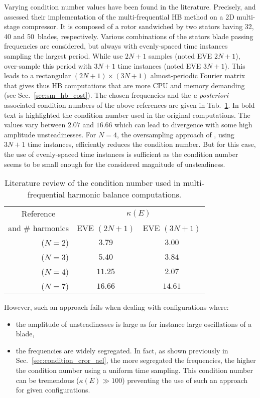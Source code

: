 Varying condition number values have been found in the literature.
Precisely, \citet{Gopinath2007} and
\citet{Ekici2007} assessed their implementation of the
multi-frequential HB method on a 2D multi-stage compressor. 
It is composed of a rotor sandwiched by two stators having
32, 40 and 50~blades, respectively. Various combinations of the stators
blade passing frequencies are considered, 
but always with evenly-spaced time instances sampling the
largest period.  While \citet{Gopinath2007} use $2N+1$ samples (noted EVE $2N+1$),
\citet{Ekici2007} over-sample this period with $3N+1$ time instances
(noted EVE $3N+1$). This
leads to a rectangular $(2N+1)\times(3N+1)$ almost-periodic Fourier
matrix that gives thus HB computations that are more CPU and memory demanding
(see Sec.~\ref{sec:sm_hb_cost}). 
The chosen frequencies and the \emph{a posteriori}
associated condition numbers of the above references are given in
Tab.~\ref{tab:literature_multistage}.  
In bold text is highlighted the condition number used in the
original computations. The values vary between $2.07$
and $16.66$ which can lead to divergence with some
high amplitude unsteadinesses.
For $N=4$, the
oversampling approach of \citet{Ekici2007}, using $3N+1$ 
time instances, efficiently reduces the
condition number. But for this case, the use of evenly-spaced time
instances is sufficient as the condition number seems to be small enough
for the considered magnitude of unsteadiness.
\begin{table}[htp]
   \centering
  \begin{tabular}{rcc}
    \toprule
    \multicolumn{1}{c}{Reference} & \multicolumn{2}{c}{$\kappa(E)$} \\
    \multicolumn{1}{c}{and \# harmonics} & EVE $(2N+1)$ & EVE $(3N+1)$ \\
    \midrule
    \citet{Gopinath2007} ($N=2$) & $\mathbf{3.79}$ & $3.00$ \\
    \citet{Ekici2007} ($N=3$) & $5.40$ & $\mathbf{3.84}$ \\
    \citet{Gopinath2007} ($N=4$) & $\mathbf{11.25}$ & $2.07$ \\
    \citet{Gopinath2007} ($N=7$) & $\mathbf{16.66}$ & $14.61$ \\
    \bottomrule
  \end{tabular}
  \caption{Literature review of the condition number used in multi-frequential
  harmonic balance computations.}
  \label{tab:literature_multistage}
\end{table}

However, such an approach fails when dealing with configurations where:
\begin{itemize} \itemsep0pt \parskip0pt
  \item the amplitude of unsteadinesses is large as for instance
  large oscillations of a blade,
  \item the frequencies are widely segregated. In fact, as shown previously
  in Sec.~\ref{sec:condition_cror_ael}, the more segregated the frequencies, the
  higher the condition number using a uniform time sampling. This condition number
  can be tremendous ($\kappa (E) \gg 100$) preventing the use of such
  an approach for given configurations.
\end{itemize}

